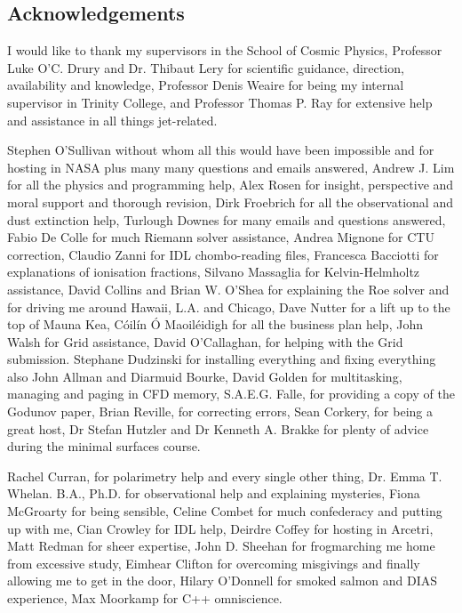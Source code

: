 \subsection*{Acknowledgements}

I would like to thank my supervisors in the School of Cosmic Physics, Professor
Luke O'C. Drury and Dr. Thibaut Lery for scientific guidance, direction,
availability and knowledge, Professor Denis Weaire for being my internal
supervisor in Trinity College, and Professor Thomas P. Ray for extensive help and assistance in all things jet-related.

Stephen O'Sullivan without whom all this would have been impossible and for hosting in NASA plus many many questions and emails answered,
Andrew J. Lim for all the physics and programming help,
Alex Rosen for insight, perspective and moral support and thorough revision,
Dirk Froebrich for all the observational and dust extinction help,
Turlough Downes for many emails and questions answered,
Fabio De Colle for much Riemann solver assistance,
Andrea Mignone for CTU correction,
Claudio Zanni for IDL chombo-reading files,
Francesca Bacciotti for explanations of ionisation fractions,
Silvano Massaglia for Kelvin-Helmholtz assistance,
David Collins and Brian W. O'Shea for explaining the Roe solver and for driving me around Hawaii, L.A. and Chicago,
Dave Nutter for a lift up to the top of Mauna Kea,
C\'{o}il\'{i}n \'O Maoil\'{e}idigh for all the business plan help,
John Walsh for Grid assistance,
David O'Callaghan, for helping with the Grid submission.
Stephane Dudzinski for installing everything and fixing everything
also John Allman and Diarmuid Bourke,
David Golden for multitasking, managing and paging in CFD memory,
S.A.E.G. Falle, for providing a copy of the Godunov paper,
Brian Reville, for correcting errors,
Sean Corkery, for being a great host,
Dr Stefan Hutzler and Dr Kenneth A. Brakke for plenty of advice during the minimal surfaces course.

Rachel Curran, for polarimetry help and every single other thing,
Dr. Emma T. Whelan. B.A., Ph.D. for observational help and explaining mysteries,
Fiona McGroarty for being sensible,
Celine Combet for much confederacy and putting up with me,
Cian Crowley for IDL help,
Deirdre Coffey for hosting in Arcetri,
Matt Redman for sheer expertise,
John D. Sheehan for frogmarching me home from excessive study,
Eimhear Clifton for overcoming misgivings and finally allowing me to get in the door,
Hilary O'Donnell for smoked salmon and DIAS experience,
Max Moorkamp for C++ omniscience.

